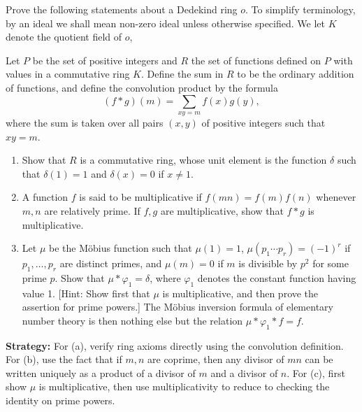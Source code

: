 Prove the following statements about a Dedekind ring $o$. To simplify terminology,
by an ideal we shall mean non-zero ideal unless otherwise specified. We let $K$
denote the quotient field of $o$,

\begin{problembox}
Let $P$ be the set of positive integers and $R$ the set of functions defined on $P$ with values in a commutative ring $K$. Define the sum in $R$ to be the ordinary addition of functions, and define the convolution product by the formula
\[ (f * g)(m) = \sum_{xy=m} f(x)g(y), \]
where the sum is taken over all pairs $(x, y)$ of positive integers such that $xy = m$.
\begin{enumerate}[label=(\alph*)]
    \item Show that $R$ is a commutative ring, whose unit element is the function $\delta$ such that $\delta(1) = 1$ and $\delta(x) = 0$ if $x \neq 1$.
    \item A function $f$ is said to be multiplicative if $f(mn) = f(m)f(n)$ whenever $m, n$ are relatively prime. If $f, g$ are multiplicative, show that $f * g$ is multiplicative.
    \item Let $\mu$ be the M\"obius function such that $\mu(1) = 1$, $\mu(p_1 \cdots p_r) = (-1)^r$ if $p_1, \ldots, p_r$ are distinct primes, and $\mu(m) = 0$ if $m$ is divisible by $p^2$ for some prime $p$. Show that $\mu * \varphi_1 = \delta$, where $\varphi_1$ denotes the constant function having value 1. [Hint: Show first that $\mu$ is multiplicative, and then prove the assertion for prime powers.] The M\"obius inversion formula of elementary number theory is then nothing else but the relation $\mu * \varphi_1 * f = f$.
\end{enumerate}
\end{problembox}

\noindent\textbf{Strategy:} For (a), verify ring axioms directly using the convolution definition. For (b), use the fact that if $m, n$ are coprime, then any divisor of $mn$ can be written uniquely as a product of a divisor of $m$ and a divisor of $n$. For (c), first show $\mu$ is multiplicative, then use multiplicativity to reduce to checking the identity on prime powers.

